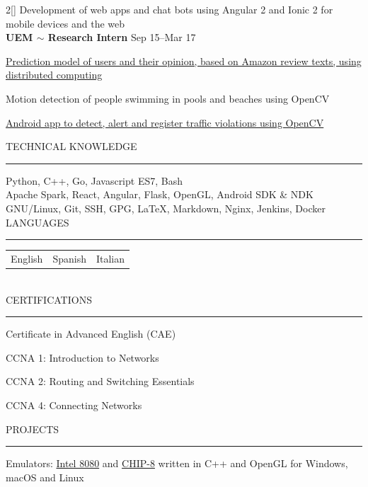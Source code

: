 \documentclass[a4paper, 12pt]{article}
\newenvironment{myparacol}[2][]{%
\begin{paracol}{#2}[#1]\setlength{\parindent}{0pt}}{%
\end{paracol}}
\begin{document}
\begin{sloppypar}
\begin{myparacol}{2}
    Development of web apps and chat bots using Angular 2 and Ionic 2 for mobile devices and the web\\

    \textbf{UEM $\sim$ Research Intern} \hfill Sep 15--Mar 17

    \href{https://www.researchgate.net/publication/314142014_Prediction_of_User_Opinion_for_Products_-_A_Bag-of-Words_and_Collaborative_Filtering_based_Approach}{Prediction model of users and their opinion, based on Amazon review texts, using distributed computing}

    Motion detection of people swimming in pools and beaches using OpenCV

    \href{https://github.com/hugo19941994/infrac-coche}{Android app to detect, alert and register traffic violations using OpenCV}
    \\

    \switchcolumn{}

    TECHNICAL KNOWLEDGE
    \vspace{1mm}
    \hrule
    \kern9pt

    Python, C++, Go, Javascript ES7, Bash\\

    Apache Spark, React, Angular, Flask, OpenGL, Android SDK \& NDK\\

    GNU/Linux, Git, SSH, GPG, \LaTeX, Markdown, Nginx, Jenkins, Docker\\

    LANGUAGES
    \vspace{1mm}
    \hrule
    \kern9pt
    \noindent\begin{tabularx}{\columnwidth}{@{} X X X}
        English & Spanish & Italian
    \end{tabularx}
    \\

    CERTIFICATIONS
    \vspace{1mm}
    \hrule
    \kern9pt
    Certificate in Advanced English (CAE)

    CCNA 1: Introduction to Networks

    CCNA 2: Routing and Switching Essentials

    CCNA 4: Connecting Networks

    \switchcolumn{}

    \noindent PROJECTS
    \vspace{1mm}
    \hrule
    \kern9pt
    Emulators: \href{https://github.com/hugo19941994/SpaceInvaders-Emu}{Intel 8080} and \href{https://github.com/hugo19941994/CHIP8-Emu}{CHIP-8} written in C++ and OpenGL for Windows, macOS and Linux


\end{myparacol}
\end{sloppypar}
\end{document}
